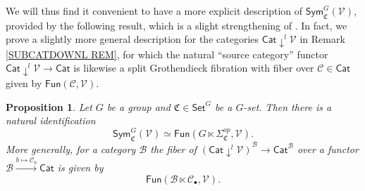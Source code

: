 \documentclass[a4paper,10pt
,draft
]{article}%
\numberwithin{equation}{section}
\numberwithin{figure}{section}
\newtheorem{proposition}[equation]{Proposition}%
\theoremstyle{definition} %
\newcommand{\V}{\ensuremath{\mathcal V}}
\newcommand{\1}{\ensuremath{\mathbbm 1}}%
\begin{document}
We will thus find it convenient to have a more explicit description of
$\mathsf{Sym}^G_{\mathfrak{C}}(\V)$,
provided by the following result, 
which is a slight strengthening of
\cite[Lemma A.6]{BP_geo}.
In fact, we prove a slightly more general description
for the categories $\mathsf{Cat} \downarrow^l \mathcal{V}$
in Remark \ref{SUBCATDOWNL REM},
for which the natural ``source category'' functor
$\mathsf{Cat} \downarrow^l \mathcal{V} \to \mathsf{Cat}$
is likewise a split Grothendieck fibration
with fiber over $\mathcal{C} \in \mathsf{Cat}$
given by
$\mathsf{Fun}(\mathcal{C},\mathcal{V})$.



\begin{proposition}\label{EQUIVFNCON PROP}
Let $G$ be a group and $\mathfrak{C} \in \mathsf{Set}^G$
be a $G$-set. Then there is a natural identification
\[
\mathsf{Sym}^G_{\mathfrak{C}}(\V)
\simeq
\mathsf{Fun}(G \ltimes \Sigma^{op}_{\mathfrak{C}},\V).
\]
More generally, 
for a category $\mathcal{B}$
the fiber of
$\left(\mathsf{Cat} \downarrow^l \V \right)^{\mathcal{B}}
\to \mathsf{Cat}^{\mathcal{B}}$
over a functor
$\mathcal{B} \xrightarrow{b \mapsto \mathcal{C}_b} \mathsf{Cat}$
is given by
\begin{equation}\label{FUNBLTICV EQ}
\mathsf{Fun}(\mathcal{B} \ltimes \mathcal{C}_{\bullet},\V).
\end{equation}
\end{proposition}
\end{document}
